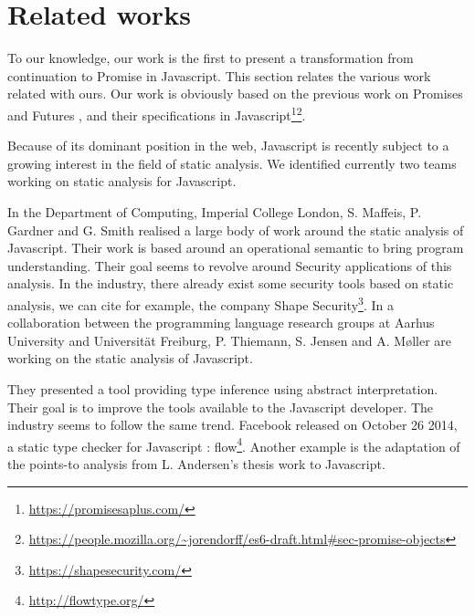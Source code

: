 \section{Related works} \label{section:related}

To our knowledge, our work is the first to present a transformation from continuation to Promise in Javascript.
This section relates the various work related with ours.
Our work is obviously based on the previous work on Promises and Futures \cite{Liskov1988}, and their specifications in Javascript\footnote{\url{https://promisesaplus.com/}}\footnote{\url{https://people.mozilla.org/~jorendorff/es6-draft.html\#sec-promise-objects}}.

Because of its dominant position in the web, Javascript is recently subject to a growing interest in the field of static analysis.
We identified currently two teams working on static analysis for Javascript.

In the Department of Computing, Imperial College London, S. Maffeis, P. Gardner and G. Smith realised a large body of work around the static analysis of Javascript.
Their work is based around an operational semantic\cite{Maffeis2008} to bring program understanding\cite{Smith2011,Gardner2012,Gardner2013}.
Their goal seems to revolve around Security applications of this analysis\cite{Maffeis2009,Maffeis2009a}.
In the industry, there already exist some security tools based on static analysis, we can cite for example, the company Shape Security\footnote{\url{https://shapesecurity.com/}}.
In a collaboration between the programming language research groups at Aarhus University and Universität Freiburg, P. Thiemann, S. Jensen and A. Møller are working on the static analysis of Javascript.

They presented a tool providing type inference using abstract interpretation\cite{Thiemann2005,Jensen2009,Jensen2012}.
Their goal is to improve the tools available to the Javascript developer\cite{Andreasen}.
The industry seems to follow the same trend.
Facebook released on October 26 2014, a static type checker for Javascript : flow\footnote{\url{http://flowtype.org/}}.
Another example is the adaptation of the points-to analysis from L. Andersen's thesis work\cite{Andersen1994} to Javascript\cite{Jang2009}.

